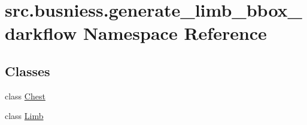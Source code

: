 \hypertarget{namespacesrc_1_1busniess_1_1generate__limb__bbox__darkflow}{}\section{src.\+busniess.\+generate\+\_\+limb\+\_\+bbox\+\_\+darkflow Namespace Reference}
\label{namespacesrc_1_1busniess_1_1generate__limb__bbox__darkflow}
\subsection*{Classes}
\begin{DoxyCompactItemize}
\item 
class \mbox{\hyperlink{classsrc_1_1busniess_1_1generate__limb__bbox__darkflow_1_1_chest}{Chest}}
\item 
class \mbox{\hyperlink{classsrc_1_1busniess_1_1generate__limb__bbox__darkflow_1_1_limb}{Limb}}
\end{DoxyCompactItemize}
